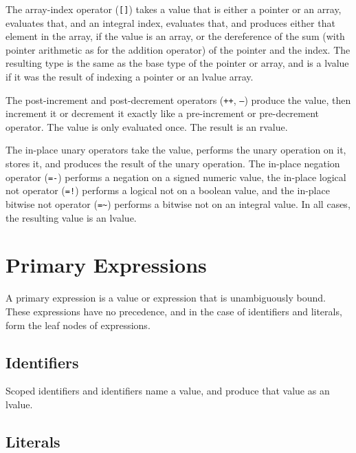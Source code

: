 \documentclass[letterpaper,12pt]{book}
\begin{document}
The array-index operator (\texttt{[]}) takes a value that is either a pointer or an array, evaluates that, and an integral index, evaluates that, and produces either that element in the array, if the value is an array, or the dereference of the sum (with pointer arithmetic as for the addition operator) of the pointer and the index. The resulting type is the same as the base type of the pointer or array, and is a lvalue if it was the result of indexing a pointer or an lvalue array.

The post-increment and post-decrement operators (\texttt{++}, \texttt{--}) produce the value, then increment it or decrement it exactly like a pre-increment or pre-decrement operator. The value is only evaluated once. The result is an rvalue.

The in-place unary operators take the value, performs the unary operation on it, stores it, and produces the result of the unary operation. The in-place negation operator (\texttt{=-}) performs a negation on a signed numeric value, the in-place logical not operator (\texttt{=!}) performs a logical not on a boolean value, and the in-place bitwise not operator (\texttt{=\~{}}) performs a bitwise not on an integral value. In all cases, the resulting value is an lvalue.

\section{Primary Expressions}



A primary expression is a value or expression that is unambiguously bound. These expressions have no precedence, and in the case of identifiers and literals, form the leaf nodes of expressions.

\subsection{Identifiers}

Scoped identifiers and identifiers name a value, and produce that value as an lvalue.

\subsection{Literals}


\end{document}
